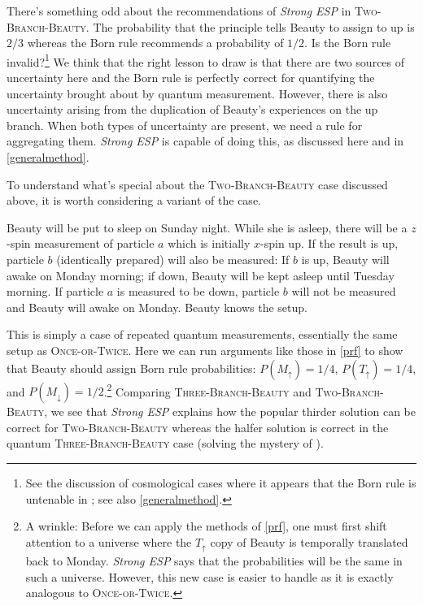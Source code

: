 \documentclass[onecolumn,secnumarabic,amsmath,amssymb,balancelastpage,nofootinbib]{article}
\begin{document}
There's something odd about the recommendations of \emph{Strong ESP} in \textsc{Two-Branch-Beauty}.  The probability that the principle tells Beauty to assign to up is $2/3$ whereas the Born rule recommends a probability of $1/2$.  Is the Born rule invalid?\footnote{See the discussion of cosmological cases where it appears that the Born rule is untenable in \citep{Page:2009qe}; see also \textsection \ref{generalmethod}.}  We think that the right lesson to draw is that there are two sources of uncertainty here and the Born rule is perfectly correct for quantifying the uncertainty brought about by quantum measurement.  However, there is also uncertainty arising from the duplication of Beauty's experiences on the up branch.  When both types of uncertainty are present, we need a rule for aggregating them.  \emph{Strong ESP} is capable of doing this, as discussed here and in \textsection \ref{generalmethod}.

To understand what's special about the \textsc{Two-Branch-Beauty} case discussed above, it is worth considering a variant of the case.
\begin{description}[font=\normalfont\scshape]
\item[Three-Branch-Beauty] Beauty will be put to sleep on Sunday night.  While she is asleep, there will be a $z$-spin measurement of particle $a$ which is initially $x$-spin up.  If the result is up, particle $b$ (identically prepared) will also be measured: If $b$ is up, Beauty will awake on Monday morning; if down, Beauty will be kept asleep until Tuesday morning.  If particle $a$ is measured to be down, particle $b$ will not be measured and Beauty will awake on Monday.  Beauty knows the setup.
\end{description}
This is simply a case of repeated quantum measurements, essentially the same setup as \textsc{Once-or-Twice}.  Here we can run arguments like those in \textsection \ref{prf} to show that Beauty should assign Born rule probabilities: $P\left(M_\uparrow\right)=1/4$, $P\left(T_\uparrow\right)=1/4$, and $P\left(M_\downarrow\right)=1/2$.\footnote{A wrinkle:  Before we can apply the methods of \textsection \ref{prf}, one must first shift attention to a universe where the $T_\uparrow$ copy of Beauty is temporally translated back to Monday.  \emph{Strong ESP} says that the probabilities will be the same in such a universe.  However, this new case is easier to handle as it is exactly analogous to \textsc{Once-or-Twice}.}  Comparing \textsc{Three-Branch-Beauty} and \textsc{Two-Branch-Beauty}, we see that \emph{Strong ESP} explains how the popular thirder solution can be correct for \textsc{Two-Branch-Beauty} whereas the halfer solution is correct in the quantum \textsc{Three-Branch-Beauty} case (solving the mystery of \citealp{plewis}).
\end{document}
